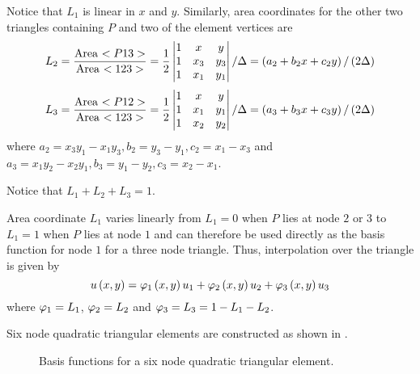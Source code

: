   Notice that $L_{1}$ is linear in $x$ and $y$. Similarly, area coordinates for
  the other two triangles containing $P$ and two of the element vertices are
\begin{equation*}
  L_{2}=\dfrac{\text{Area $<P13>$}}{\text{Area $<123>$}}=\frac12
    \begin{vmatrix}
            1 & x & y\\
            1 & x_{3} & y_{3}\\
            1 & x_{1} & y_{1}
    \end{vmatrix}
  / \Delta = \left( a_{2} + b_{2}x + c_{2}y \right)/ \left( 2 \Delta \right)
\end{equation*}
\begin{equation*}
  L_{3}=\dfrac{\text{Area $<P12>$}}{\text{Area $<123>$}}=\frac12
    \begin{vmatrix}
            1 & x & y\\
            1 & x_{1} & y_{1}\\
            1 & x_{2} & y_{2}
    \end{vmatrix}
  / \Delta = \left( a_{3} + b_{3}x + c_{3}y \right)/ \left( 2 \Delta \right)
\end{equation*}
where $a_{2} = x_{3} y_{1} - x_{1} y_{3}, b_{2} = y_{3} - y_{1}, c_{2} = x_{1}
- x_{3}$ and $a_{3} = x_{1} y_{2} - x_{2} y_{1}, b_{3} = y_{1} - y_{2}, c_{3}
= x_{2} - x_{1}$.

Notice that $L_{1} + L_{2} + L_{3} =1$.

Area coordinate $L_{1}$ varies linearly from $L_{1}=0$ when $P$ lies at node $2$
or $3$ to $L_{1}=1$ when $P$ lies at node $1$ and can therefore be used directly as
the basis function for node $1$ for a three node triangle.  Thus, interpolation
over the triangle is given by
\begin{equation*}
   u\left( x,y \right)  =    \varphi_{1} \left( x,y \right)  u_{1} +    \varphi_{2} \left( x,y \right)  u_{2} +    \varphi_{3} \left( x,y \right)  u_{3}
\end{equation*} %
where $ \varphi_{1}  = L_{1}$, $ \varphi_{2}  = L_{2}$ and $ \varphi_{3}  = L_{3}
= 1 - L_{1} - L_{2}$.

Six node quadratic triangular elements are constructed as shown in 
.
\begin{figure}[htbp] \centering
  
  \caption{Basis functions for a six node quadratic triangular element.}
  \label{fig:6nodeqt}
\end{figure}

%    

